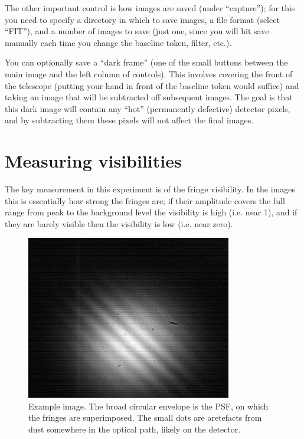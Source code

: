 \documentclass[11pt]{article}
\begin{document}
The other important control is how images are saved (under ``capture''); for this you need to specify a directory in which to save images, a file format (select ``FIT''), and a number of images to save (just one, since you will hit save manually each time you change the baseline token, filter, etc.).

You can optionally save a ``dark frame'' (one of the small buttons between the main image and the left column of controls). This involves covering the front of the telescope (putting your hand in front of the baseline token would suffice) and taking an image that will be subtracted off subsequent images. The goal is that this dark image will contain any ``hot'' (permanently defective) detector pixels, and by subtracting them these pixels will not affect the final images.

\section{Measuring visibilities}\label{sec:meas}

The key measurement in this experiment is of the fringe visibility. In the images this is essentially how strong the fringes are; if their amplitude covers the full range from peak to the background level the visibility is high (i.e. near 1), and if they are barely visible then the visibility is low (i.e. near zero).

\begin{figure}[h]
    \centering
    \includegraphics[width=0.8\textwidth]{doc/det-img.png}
    \caption{Example image. The broad circular envelope is the PSF, on which the fringes are superimposed. The small dots are aretefacts from dust somewhere in the optical path, likely on the detector.}
    \label{fig:det-img}
\end{figure}
\end{document}
